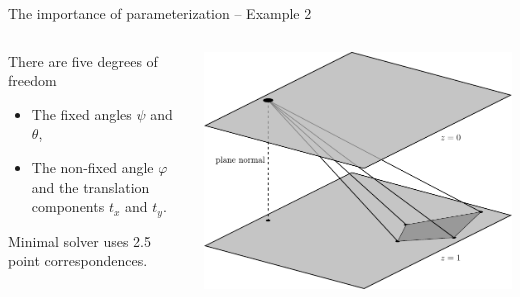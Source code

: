 \documentclass[aspectratio=169]{beamer}
\renewcommand{\phi}{\varphi}
\begin{document}
\begin{frame}[t]{The importance of parameterization -- Example 2}
\begin{columns}
    \begin{column}{0.5\textwidth}
        \begin{minipage}[t][\textheight][t]{\textwidth}
        \theimportanceTwoHeight
        There are five degrees of freedom
        \begin{itemize}
            \item The fixed angles $\psi$ and $\theta$,
            \item The non-fixed angle $\phi$ and the translation components $t_x$ and $t_y$.
        \end{itemize}

        Minimal solver uses 2.5 point correspondences.
        \end{minipage}
    \end{column}%
    \begin{column}{0.5\textwidth}
        \centering
        \includegraphics[width=\linewidth]{../lecture_notes/images/prob_geom1.pdf}
    \end{column}
\end{columns}
\end{frame}
\end{document}
